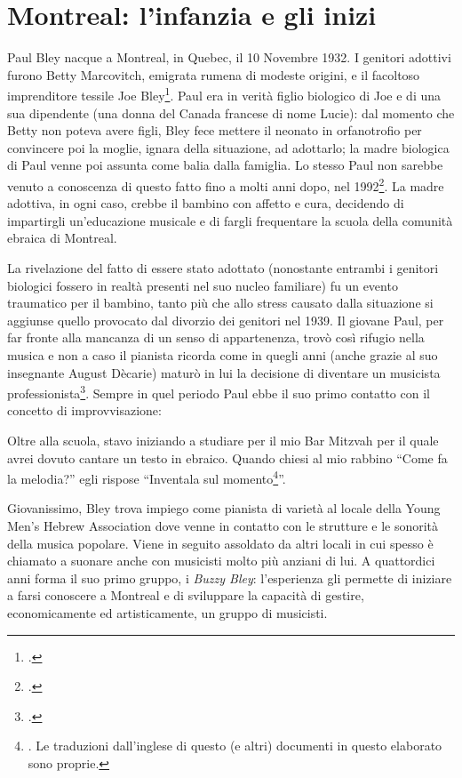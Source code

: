 \section{Montreal: l'infanzia e gli inizi}
Paul Bley nacque a Montreal, in Quebec, il 10 Novembre 1932. I genitori adottivi furono Betty Marcovitch, emigrata rumena di modeste origini, e il facoltoso imprenditore tessile Joe Bley\footcite[10]{stopping}. Paul era in verità figlio biologico di Joe e di una sua dipendente (una donna del Canada francese di nome Lucie): dal momento che Betty non poteva avere figli, Bley fece mettere il neonato in orfanotrofio per convincere poi la moglie, ignara della situazione, ad adottarlo; la madre biologica di Paul venne poi assunta come balia dalla famiglia. Lo stesso Paul non sarebbe venuto a conoscenza di questo fatto fino a molti anni dopo, nel 1992\footcite[13]{stopping}. La madre adottiva, in ogni caso, crebbe il bambino con affetto e cura, decidendo di impartirgli un'educazione musicale e di fargli frequentare la scuola della comunità ebraica di Montreal.\par
La rivelazione del fatto di essere stato adottato (nonostante entrambi i genitori biologici fossero in realtà presenti nel suo nucleo familiare) fu un evento traumatico per il bambino, tanto più che allo stress causato dalla situazione si aggiunse quello provocato dal divorzio dei genitori nel 1939. Il giovane Paul, per far fronte alla mancanza di un senso di appartenenza, trovò così rifugio nella musica e non a caso il pianista ricorda come in quegli anni (anche grazie al suo insegnante August Dècarie) maturò in lui la decisione di diventare un musicista professionista\footcite[15]{stopping}. Sempre in quel periodo Paul ebbe il suo primo contatto con il concetto di improvvisazione:
\begin{fquote}
	Oltre alla scuola, stavo iniziando a studiare per il mio Bar Mitzvah per il quale avrei dovuto cantare un testo in ebraico. Quando chiesi al mio rabbino ``Come fa la melodia?'' egli rispose ``Inventala sul momento\footnote{\cite[16]{stopping}. Le traduzioni dall'inglese di questo (e altri) documenti in questo elaborato sono proprie.}''.
\end{fquote}
Giovanissimo, Bley trova impiego come pianista di varietà al locale della Young Men's Hebrew Association dove venne in contatto con le strutture e le sonorità della musica popolare. Viene in seguito assoldato da altri locali in cui spesso è chiamato a suonare anche con musicisti molto più anziani di lui.
A quattordici anni forma il suo primo gruppo, i \textit{Buzzy Bley}: l'esperienza gli permette di iniziare a farsi conoscere a Montreal e di sviluppare la capacità di gestire, economicamente ed artisticamente, un gruppo di musicisti. \\
